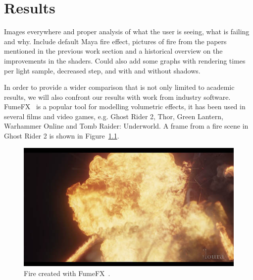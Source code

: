 \chapter{Results}
\label{ch:results}

Images everywhere and proper analysis of what the user is seeing, what is failing and why.
Include default Maya fire effect, pictures of fire from the papers mentioned in the previous work section and a historical overview on the improvements in the shaders.
Could also add some graphs with rendering times per light sample, decreased step, and with and without shadows.

In order to provide a wider comparison that is not only limited to academic results, we will also confront our results with work from industry software.
FumeFX~\cite{FumeFX} is a popular tool for modelling volumetric effects, it has been used in several films and video games, e.g. Ghost Rider 2, Thor, Green Lantern, Warhammer Online and Tomb Raider: Underworld.
A frame from a fire scene in Ghost Rider 2 is shown in Figure~\ref{fig:fumefx}.

\begin{figure}[htbp]
	\centering
	\includegraphics[width=\textwidth]{img/fumefx}
	\caption{Fire created with FumeFX~\cite{FumeFX}.}
	\label{fig:fumefx}
\end{figure}

